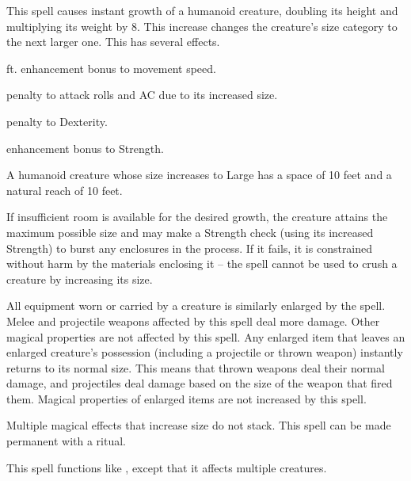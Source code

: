\spellrng{\rngclose}
\begin{spelleffect}
  This spell causes instant growth of a humanoid creature, doubling its height and multiplying its weight by 8. This increase changes the creature's size category to the next larger one. This has several effects.
  \begin{itemize*} 
    \item {} ft. enhancement bonus to movement speed.
    \item {} penalty to attack rolls and AC due to its increased size.
  \item {} penalty to Dexterity.
  \item {} enhancement bonus to Strength.
  \end{itemize*}
  \par A humanoid creature whose size increases to Large has a space of 10 feet and a natural reach of 10 feet.
  \par If insufficient room is available for the desired growth, the creature attains the maximum possible size and may make a Strength check (using its increased Strength) to burst any enclosures in the process. If it fails, it is constrained without harm by the materials enclosing it -- the spell cannot be used to crush a creature by increasing its size.
  \par All equipment worn or carried by a creature is similarly enlarged by the spell. Melee and projectile weapons affected by this spell deal more damage. Other magical properties are not affected by this spell. Any enlarged item that leaves an enlarged creature's possession (including a projectile or thrown weapon) instantly returns to its normal size. This means that thrown weapons deal their normal damage, and projectiles deal damage based on the size of the weapon that fired them. Magical properties of enlarged items are not increased by this spell.
\end{spelleffect}
\begin{spellnotes}
  Multiple magical effects that increase size do not stack. This spell can be made permanent with a  ritual.
\end{spellnotes}

\spellrng{\rngmed}
\begin{spelleffect}
  This spell functions like , except that it affects multiple creatures.
\end{spelleffect}

